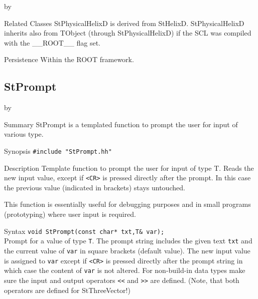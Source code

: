 \documentclass[twoside]{article}
\newcommand{\name}[1]{\textsf{#1}}%
\newcommand{\comp}[1]{\texttt{#1}}%
\newcommand{\entrylabel}[1]{\mbox{\textbf{{#1}}}\hfil}%
\newenvironment{entry}
{\begin{list}{}%
    {\renewcommand{\makelabel}{\entrylabel}%
     \setlength{\labelwidth}{90pt}%
     \setlength{\leftmargin}{\labelwidth}
     \advance\leftmargin by \labelsep%
      }%
    }%
  {\end{list}}
\newcommand{\Entrylabel}[1]%
{\raisebox{0pt}[1ex][0pt]{\makebox[\labelwidth][l]%
    {\parbox[t]{\labelwidth}{\hspace{0pt}\textbf{{#1}}}}}}
\newenvironment{Entry}%
{\renewcommand{\entrylabel}{\Entrylabel}\begin{entry}}%
  {\end{entry}}
\begin{document}
\begin{description}
\begin{Entry}
\item[Related Classes]
    StPhysicalHelixD is derived from StHelixD.
    StPhysicalHelixD inherits also from TObject (through StPhysicalHelixD) 
    if the SCL was compiled with the \name{\_\_ROOT\_\_} flag set.
    
\item[Persistence]
    Within the ROOT framework.

\end{Entry}


\clearpage

%
%
\subsection{StPrompt } \label{ref:StPrompt}
\begin{Entry}
\item[Summary]
    StPrompt is a templated function to prompt the user for input of
    various type.
    
\item[Synopsis]
    \verb+#include "StPrompt.hh"+
    
  
\item[Description]   
  Template function to prompt the user for input of type T.
  Reads the new input value, except if \verb+<CR>+ is 
  pressed directly after the prompt. In this case the
  previous value (indicated in brackets) stays untouched.

  This function is essentially useful for debugging purposes and in small
  programs (prototyping) where user input is required.
  
\item[Syntax]
    \verb+void StPrompt(const char* txt,T& var);+\\
    Prompt for a value of type \comp{T}. The prompt string includes
    the given text \comp{txt} and the current value of \comp{var}
    in square brackets (default value). The new input value is assigned
    to \comp{var} except if \verb+<CR>+ is pressed directly after the prompt
    string in which case the content of \comp{var} is not altered.
    For non-build-in data types make sure the input and output 
    operators \verb+<<+ and \verb+>>+ are defined. (Note, that 
    both operators are defined for StThreeVector!)


\end{Entry}
\end{description}
\end{document}
